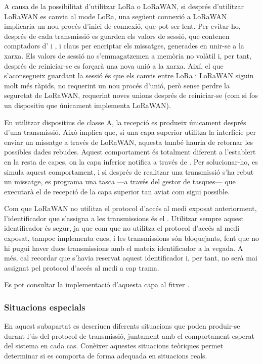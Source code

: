 \documentclass{tfgitic}[2024/07/01]
\begin{document}
{A causa de la possibilitat d'utilitzar LoRa o LoRaWAN, si després d'utilitzar LoRaWAN es canvia al mode LoRa, una següent connexió a LoRaWAN implicaria un nou procés d'inici de connexió, que pot ser lent. Per evitar-ho, després de cada transmissió es guarden els valors de sessió, que contenen comptadors d' i , i claus per encriptar els missatges, generades en unir-se a la xarxa. Els valors de sessió no s'emmagatzemen a memòria no volàtil i, per tant, després de reiniciar-se es forçarà una nova unió a la xarxa. Així, el que s'aconsegueix guardant la sessió és que els canvis entre LoRa i LoRaWAN siguin molt més ràpids, no requerint un nou procés d'unió, però sense perdre la seguretat de LoRaWAN, requerint noves unions després de reiniciar-se (com si fos un dispositiu que únicament implementa LoRaWAN).

En utilitzar dispositius de classe A, la recepció es produeix únicament després d'una transmissió. Això implica que, si una capa superior utilitza la interfície per enviar un missatge a través de LoRaWAN, aquesta també hauria de retornar les possibles dades rebudes. Aquest comportament és totalment diferent a l'establert en la resta de capes, on la capa inferior notifica a través de . Per solucionar-ho, es simula aquest comportament, i si després de realitzar una transmissió s'ha rebut un missatge, es programa una tasca ---a través del gestor de tasques--- que executarà el  de recepció de la capa superior tan aviat com sigui possible. 

Com que LoRaWAN no utilitza el protocol d'accés al medi exposat anteriorment, l'identificador que s'assigna a les transmissions és el . Utilitzar sempre aquest identificador és segur, ja que com que no utilitza el protocol d'accés al medi exposat, tampoc implementa cues, i les transmissions són bloquejants, fent que no hi pugui haver dues transmissions amb el mateix identificador a la vegada. A més, cal recordar que s'havia reservat aquest identificador i, per tant, no serà mai assignat pel protocol d'accés al medi a cap trama.

Es pot consultar la implementació d'aquesta capa al fitxer .
\subsubsection{Situacions especials}
En aquest subapartat es descriuen diferents situacions que poden produir-se durant l'ús del protocol de transmissió, juntament amb el comportament esperat del sistema en cada cas. Conèixer aquestes situacions teòriques permet determinar si es comporta de forma adequada en situacions reals.

}
\end{document}
